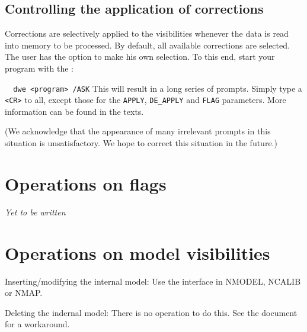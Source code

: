 \subsection{ Controlling the application of corrections } 
\label{.apply} 

        Corrections are selectively applied to the visibilities whenever the
data is read into memory to be processed. By default, all available corrections
are selected. The user has the option to make his own selection. To this end,
start your program with the : 
\bi 
\item[] \verb:  dwe <program> /ASK: 
\ei This will result in a long series of prompts. Simply type a \verb/<CR>/ to
all, except those for the \verb/APPLY/, \verb/DE_APPLY/ and \verb/FLAG/
parameters. More information can be found in the  texts. 

        (We acknowledge that the appearance of many irrelevant prompts in this
situation is unsatisfactory. We hope to correct this situation in the future.) 


\section{ Operations on flags } 

{\em Yet to be written } 


\section{ Operations on model visibilities } 
\label{.model} 

\bi 
\item   Inserting/modifying the internal model: Use the  interface in NMODEL, NCALIB or NMAP. 
\item   Deleting the indernal model: There is no operation to do this. See the 
         document for a workaround. 
\ei 



